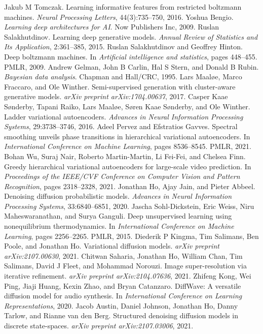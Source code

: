 \begin{chapterreferences}
 Jakub M Tomczak. Learning informative features from restricted boltzmann machines. \textit{Neural Processing Letters}, 44(3):735–750, 2016.
 Yoshua Bengio. \textit{Learning deep architectures for AI}. Now Publishers Inc, 2009.
 Ruslan Salakhutdinov. Learning deep generative models. \textit{Annual Review of Statistics and Its Application}, 2:361–385, 2015.
 Ruslan Salakhutdinov and Geoffrey Hinton. Deep boltzmann machines. In \textit{Artificial intelligence and statistics}, pages 448–455. PMLR, 2009.
 Andrew Gelman, John B Carlin, Hal S Stern, and Donald B Rubin. \textit{Bayesian data analysis}. Chapman and Hall/CRC, 1995.
 Lars Maaløe, Marco Fraccaro, and Ole Winther. Semi-supervised generation with cluster-aware generative models. \textit{arXiv preprint arXiv:1704.00637}, 2017.
 Casper Kaae Sønderby, Tapani Raiko, Lars Maaløe, Søren Kaae Sønderby, and Ole Winther. Ladder variational autoencoders. \textit{Advances in Neural Information Processing Systems}, 29:3738–3746, 2016.
 Adeel Pervez and Efstratios Gavves. Spectral smoothing unveils phase transitions in hierarchical variational autoencoders. In \textit{International Conference on Machine Learning}, pages 8536–8545. PMLR, 2021.
 Bohan Wu, Suraj Nair, Roberto Martin-Martin, Li Fei-Fei, and Chelsea Finn. Greedy hierarchical variational autoencoders for large-scale video prediction. In \textit{Proceedings of the IEEE/CVF Conference on Computer Vision and Pattern Recognition}, pages 2318–2328, 2021.
 Jonathan Ho, Ajay Jain, and Pieter Abbeel. Denoising diffusion probabilistic models. \textit{Advances in Neural Information Processing Systems}, 33:6840–6851, 2020.
 Jascha Sohl-Dickstein, Eric Weiss, Niru Maheswaranathan, and Surya Ganguli. Deep unsupervised learning using nonequilibrium thermodynamics. In \textit{International Conference on Machine Learning}, pages 2256–2265. PMLR, 2015.
 Diederik P Kingma, Tim Salimans, Ben Poole, and Jonathan Ho. Variational diffusion models. \textit{arXiv preprint arXiv:2107.00630}, 2021.
 Chitwan Saharia, Jonathan Ho, William Chan, Tim Salimans, David J Fleet, and Mohammad Norouzi. Image super-resolution via iterative refinement. \textit{arXiv preprint arXiv:2104.07636}, 2021.
 Zhifeng Kong, Wei Ping, Jiaji Huang, Kexin Zhao, and Bryan Catanzaro. DiffWave: A versatile diffusion model for audio synthesis. In \textit{International Conference on Learning Representations}, 2020.
 Jacob Austin, Daniel Johnson, Jonathan Ho, Danny Tarlow, and Rianne van den Berg. Structured denoising diffusion models in discrete state-spaces. \textit{arXiv preprint arXiv:2107.03006}, 2021.

\end{chapterreferences}

